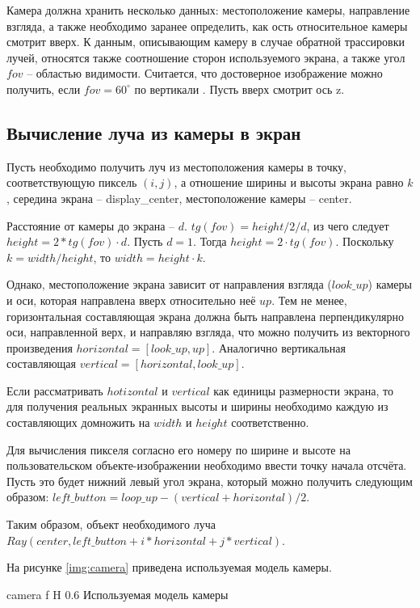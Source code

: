 Камера должна хранить несколько данных: местоположение камеры, направление взгляда, а также необходимо заранее определить, как ость относительное камеры смотрит вверх. 
К данным, описывающим камеру в случае обратной трассировки лучей, относятся также соотношение сторон используемого экрана, а также угол $fov$ -- областью видимости. 
Считается, что достоверное изображение можно получить, если $fov = 60^\circ$ по вертикали \cite{kgmmgtu}.
Пусть вверх смотрит ось z.


\subsection{Вычисление луча из камеры в экран}

Пусть необходимо получить луч из местоположения камеры в точку, соответствующую пиксель $(i, j)$, а отношение ширины и высоты экрана равно $k$, середина экрана -- display\_center, местоположение камеры -- center.

 Расстояние от камеры до экрана -- $d$. $tg(fov) = height / 2 / d $, из чего следует $height = 2 * tg(fov) \cdot d$. 
 Пусть $d = 1$. 
 Тогда $height = 2 \cdot tg(fov)$. 
 Поскольку $k = width / height$, то $width = height \cdot k $. 
 
 Однако, местоположение экрана зависит от направления взгляда ($look\_up$) камеры и оси, которая направлена вверх относительно неё $up$. 
 Тем не менее, горизонтальная составляющая экрана должна быть направлена перпендикулярно оси, направленной верх, и направляю взгляда, что можно получить из векторного произведения $horizontal = [look\_up, up]$. 
 Аналогично вертикальная составляющая $vertical = [horizontal, look\_up]$. 
 
 Если рассматривать $hotizontal$ и $vertical$ как единицы размерности экрана, то для получения реальных экранных высоты и ширины необходимо каждую из составляющих домножить на $width$ и $height$ соответственно. 
 
 Для вычисления пикселя согласно его номеру по ширине и высоте на пользовательском объекте-изображении необходимо ввести точку начала отсчёта. Пусть это будет нижний левый угол экрана, который можно получить следующим образом: $left\_button = loop\_up - (vertical + horizontal) / 2$.
 
 Таким образом, объект необходимого луча $Ray(center,  left\_button + i * horizontal + j * vertical)$.
 
 На рисунке \ref{img:camera} приведена используемая модель камеры.
 
 {camera}
 {f}
 {H}
 {0.6\textwidth}
 {Используемая модель камеры}

